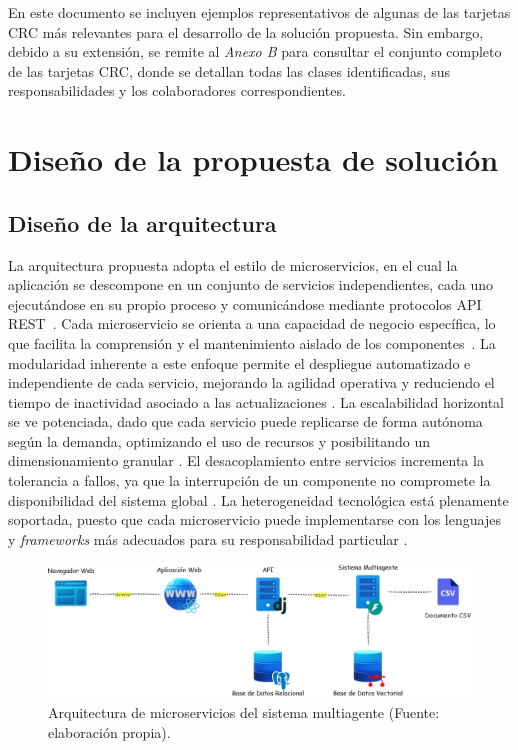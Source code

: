 En este documento se incluyen ejemplos representativos de algunas de las tarjetas CRC más relevantes para el desarrollo de la solución propuesta. Sin embargo, debido a su extensión, se remite al \textit{Anexo B} para consultar el conjunto completo de las tarjetas CRC, donde se detallan todas las clases identificadas, sus responsabilidades y los colaboradores correspondientes.

\section{Diseño de la propuesta de solución}

\subsection{Diseño de la arquitectura}

La arquitectura propuesta adopta el estilo de microservicios, en el cual la aplicación se descompone en un conjunto de servicios independientes, cada uno ejecutándose en su propio proceso y comunicándose mediante protocolos API REST~\cite{turn0search0}. Cada microservicio se orienta a una capacidad de negocio específica, lo que facilita la comprensión y el mantenimiento aislado de los componentes~\cite{turn0search6,turn0search0}. La modularidad inherente a este enfoque permite el despliegue automatizado e independiente de cada servicio, mejorando la agilidad operativa y reduciendo el tiempo de inactividad asociado a las actualizaciones \cite{turn0search8,turn0search3}. La escalabilidad horizontal se ve potenciada, dado que cada servicio puede replicarse de forma autónoma según la demanda, optimizando el uso de recursos y posibilitando un dimensionamiento granular \cite{turn0search3,turn1search0}. El desacoplamiento entre servicios incrementa la tolerancia a fallos, ya que la interrupción de un componente no compromete la disponibilidad del sistema global \cite{turn0search2,turn0search6}. La heterogeneidad tecnológica está plenamente soportada, puesto que cada microservicio puede implementarse con los lenguajes y \textit{frameworks} más adecuados para su responsabilidad particular \cite{turn0search6,turn1search8}.

\begin{figure}[htbp] 
	\centering
	\includegraphics[width=1\textwidth]{images/Arquitectura.png} 
	\caption{Arquitectura de microservicios del sistema multiagente (Fuente: elaboración propia).}
	\label{fig:erquitectura_MAS}
\end{figure}

